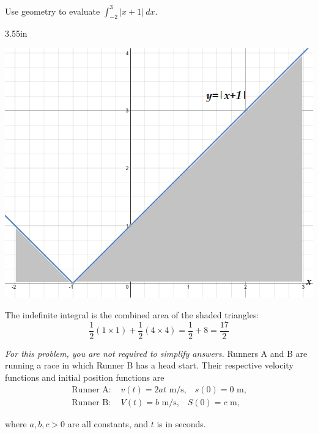 \documentclass[12pt, addpoints]{exam}
\newcommand{\vstr}{\vspace{\stretch{1}}}
\theoremstyle{plain}
\begin{document}
\begin{questions}
\thispagestyle{headandfoot}
\question[10] Use geometry to evaluate $\int_{-2}^3|x+1|\ dx$.
\begin{solutionbox}
{3.55in}
\vspace{-1.9pc}
\begin{center}
\includegraphics[scale=0.5]{exam4Sec5p2}
\end{center}

\vspace{-1pc}
The indefinite integral is the combined area of the shaded triangles:
\vspace{-0.5pc}
\[
\frac{1}{2}\left(1\times 1\right)+\frac{1}{2}\left(4\times 4\right)=\frac{1}{2}+8=\boxed{\frac{17}{2}}
\]
\end{solutionbox}
\vstr 

\question \emph{For this problem, you are not required to simplify answers.}  Runners A and B are running a race in which Runner B has a head start.  Their respective velocity functions and initial position functions are
\vspace{-0.5pc}
\begin{align*}
\text{Runner A: }& v(t) =2at\text{ m/s,} \quad s(0) =0 \text{ m,} \\
\text{Runner B: }& V(t) =b\text{ m/s,} \quad S(0) =c \text{ m,}
\end{align*}

\vspace{-1.25pc}
where $a,b,c>0$ are all constants, and $t$ is in seconds.


\end{questions}
\end{document}
